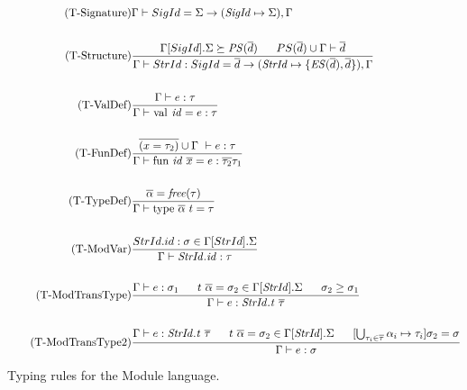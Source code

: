 \begin{figure}[htbp]
\begin{align*}
\tag{T-Signature}
&\Gamma \vdash SigId = \Sigma \rightarrow (\mathit{SigId} \mapsto \Sigma),\Gamma
\\
\\
\tag{T-Structure}
&\frac
{\Gamma[SigId].\Sigma \succeq \mathit{PS}(\overline{d}) \longspace PS(\overline{d}) \cup \Gamma \vdash \overline{d}}
{\Gamma \vdash StrId : SigId = \overline{d} \rightarrow (\mathit{StrId} \mapsto \lbrace \mathit{ES}(\overline{d}), \overline{d}\rbrace),\Gamma}
\\
\\
\tag{T-ValDef}
&\frac
{\Gamma \vdash e:\tau}
{\Gamma \vdash \text{\lsttext{val}}\ \mathit{id} = e:\tau}
\\
\\
\tag{T-FunDef}
&\frac
{\overline{(x = \tau_{2})} \cup \Gamma\ \vdash e:\tau}
{\Gamma \vdash \text{\lsttext{fun}}\ \mathit{id}\ \overline{x}= e:\overline{\tau_{2}}\tau_{1}}
\\
\\
\tag{T-TypeDef}
&\frac
{\overline{\alpha} = \mathit{free(\tau)}}
{\Gamma \vdash \text{\lsttext{type}}\ \overline{\alpha}\ t = \tau}
\\
\\
\tag{T-ModVar}
&\frac
{StrId.id:\sigma \in \Gamma[StrId].\Sigma}
{\Gamma \vdash \mathit{StrId.id} : \tau}
\\
\\
\tag{T-ModTransType}
&\frac
{\Gamma \vdash e:\sigma_{1} \longspace t\ \overline{\alpha} = \sigma_{2} \in \Gamma[\mathit{StrId}].\Sigma \longspace \sigma_{2} \geq \sigma_{1}}
{\Gamma \vdash e : \mathit{StrId.t}\ \overline{\tau}}
\\
\\
\tag{T-ModTransType2}
&\frac
{\Gamma \vdash e:\mathit{StrId.t}\ \overline{\tau} \longspace t\ \overline{\alpha} = \sigma_{2} \in \Gamma[\mathit{StrId}].\Sigma \longspace [\bigcup_{\tau_{i} \in \overline{\tau}} \alpha_{i} \mapsto \tau_{i}]\sigma_{2} = \sigma}
{\Gamma \vdash e:\sigma}
\end{align*}
\caption{Typing rules for the Module language. \label{fig:TypeRulesModule}}
\end{figure}


